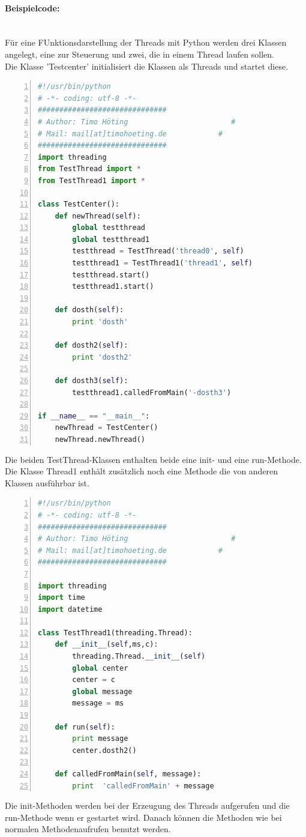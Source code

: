\paragraph{Beispielcode:}\\
Für eine FUnktionsdarstellung der Threads mit Python werden drei Klassen angelegt, eine zur Steuerung und zwei, die in einem Thread laufen sollen. \\
Die Klasse 'Testcenter' initialisiert die Klassen als Threads und startet diese.
\begin{lstlisting}[caption=Klasse Testcenter, language=python, frame=single, breaklines=true,columns=fullflexible, commentstyle=\color{gray}\upshape, captionpos=b, numbers = left]
#!/usr/bin/python
# -*- coding: utf-8 -*-
##############################
# Author: Timo Höting                        #
# Mail: mail[at]timohoeting.de            #
##############################
import threading
from TestThread import *
from TestThread1 import *

class TestCenter():
    def newThread(self):
        global testthread
        global testthread1
        testthread = TestThread('thread0', self)
        testthread1 = TestThread1('thread1', self)
        testthread.start()
        testthread1.start()

    def dosth(self):
        print 'dosth'

    def dosth2(self):
        print 'dosth2'

    def dosth3(self):
        testthread1.calledFromMain('-dosth3')

if __name__ == "__main__":
    newThread = TestCenter()
    newThread.newThread()
\end{lstlisting}
Die beiden TestThread-Klassen enthalten beide eine init- und eine run-Methode. Die Klasse Thread1 enthält zusätzlich noch eine Methode die von anderen Klassen ausführbar ist. 
\begin{lstlisting}[caption=Klasse TestThread1, language=python, frame=single, breaklines=true,columns=fullflexible, commentstyle=\color{gray}\upshape, captionpos=b, numbers = left]
#!/usr/bin/python
# -*- coding: utf-8 -*-
##############################
# Author: Timo Höting                        #
# Mail: mail[at]timohoeting.de            #
##############################

import threading
import time
import datetime

class TestThread1(threading.Thread):
    def __init__(self,ms,c):
        threading.Thread.__init__(self)
        global center
        center = c
        global message
        message = ms

    def run(self):
        print message
        center.dosth2()

    def calledFromMain(self, message):
        print  'calledFromMain' + message
\end{lstlisting}
Die init-Methoden werden bei der Erzeugung des Threads aufgerufen und die run-Methode wenn er gestartet wird. Danach können die Methoden wie bei normalen Methodenaufrufen benutzt werden. 